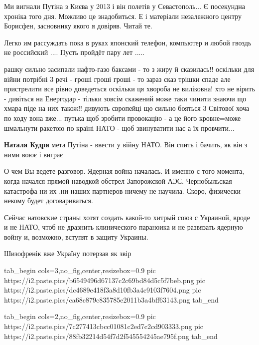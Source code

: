 \begin{itemize}

Ми вигнали Путіна з Києва у 2013 і він полетів у Севастополь... Є посекундна
хроніка того дня. Можливо це знадобиться. Е і матеріали незалежного центру
Борисфен, засновнику якого я довіряв. Читай те.


Легко им рассуждать пока в руках японский телефон, компьютер и любой гвоздь не
российский .... Пусть пройдёт пару лет .....


рашку сильно засипали нафто-газо баксами - то з жиру й сказилась!! оскільки для
війни потрібні 3 речі - гроші гроші гроші - то зараз сказ трішки спаде але
пристрелити все рівно доведеться оскільки ця хвороба не виліковна! хто не
вірить - дивіться на Енергодар - тільки зовсім скажений може таки чинити знаючи
що хмара піде на них також!! дивують європейці що сильно бояться 3 Світової
хоча по ходу вона вже... путька щоб зробити провокацію - а це його кровне=може
шмальнути ракетою по країні НАТО - щоб звинуватити нас а їх провчити...

\textbf{Наталя Кудря} мета Путіна - ввести у війну НАТО. Він спить і бачить, як він з ними воює і виграє


О чем Вы ведете разговор. Ядерная война началась. И именно с того момента,
когда начался прямой наводкой обстрел Запорожской АЭС. Чернобыльская катастрофа
ни их ,ни наших партнеров ничему не научила. Скоро, физически некому будет
договариваться.


Сейчас натовские страны хотят создать какой-то хитрый союз с Украиной, вроде и
не НАТО, чтоб не дразнить клинического параноика и не развязать ядерную войну
и, возможно, вступят в защиту Украины.

Шизофренік вже Україну потерзав як звір

\ifcmt
  tab_begin cols=3,no_fig,center,resizebox=0.9
     pic https://i2.paste.pics/b6549496d67137c2c69bd84d5c5f7beb.png
		 pic https://i2.paste.pics/dc4689e418f3a8d10fb3a4c9103f7604.png
		 pic https://i2.paste.pics/ca68c879c835785e2011b3a4bff63143.png
  tab_end
\fi

\ifcmt
  tab_begin cols=2,no_fig,center,resizebox=0.9
     pic https://i2.paste.pics/7c277413cbcc01081c2ed7c2cd903333.png
		 pic https://i2.paste.pics/88fb32214d54f7d2f545554245ae795f.png
  tab_end
\fi

\end{itemize} %
